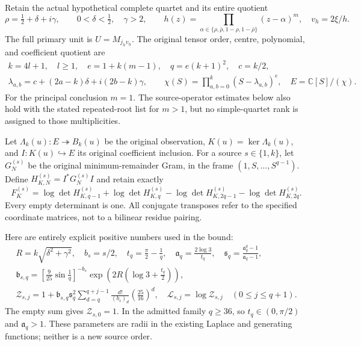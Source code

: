 \documentclass[11pt,a4paper]{article}
\begin{document}
Retain the actual hypothetical complete quartet and its entire quotient
\[
 \rho=\tfrac12+\delta+i\gamma,\qquad 0<\delta<\tfrac12,\quad \gamma>2,
 \qquad h(z)=\prod_{\alpha\in\{\rho,\bar\rho,1-\rho,1-\bar\rho\}}
 (z-\alpha)^m,\quad v_h=2\xi/h.
\]
The full primary unit is $U=M_{j_hv_h}$. The original tensor order, centre,
polynomial, and coefficient quotient are
\[
\begin{gathered}
 k=4l+1,\quad l\ge1,\quad e=1+k(m-1),\quad q=e(k+1)^2,\quad c=k/2,\\
 \lambda_{a,b}=c+(2a-k)\delta+i(2b-k)\gamma,\qquad
 \chi(S)=\prod_{a,b=0}^k(S-\lambda_{a,b})^e,
 \quad E=\mathbb C[S]/(\chi).
\end{gathered}\tag{AKS1}
\]
For the principal conclusion $m=1$. The source-operator estimates below
also hold with the stated repeated-root list for $m>1$, but no simple-quartet
rank is assigned to those multiplicities.

Let $\Lambda_k(u):E\twoheadrightarrow B_k(u)$ be the original observation,
$K(u)=\ker\Lambda_k(u)$, and $I:K(u)\hookrightarrow E$ its original
coefficient inclusion. For a source $s\in\{1,k\}$, let $G_N^{(s)}$ be the
original minimum-remainder Gram, in the frame $(1,S,\ldots,S^{q-1})$.
Define $H_{K,N}^{(s)}=I^*G_N^{(s)}I$ and retain exactly
\[
 F_K^{(s)}=
 \log\det H_{K,q-1}^{(s)}+\log\det H_{K,q}^{(s)}
 -\log\det H_{K,2q-1}^{(s)}-\log\det H_{K,2q}^{(s)}.
 \tag{AKS2}
\]
Every empty determinant is one. All conjugate transposes refer to the
specified coordinate matrices, not to a bilinear residue pairing.

Here are entirely explicit positive numbers used in the bound:
\[
\begin{gathered}
 R=k\sqrt{\delta^2+\gamma^2},\quad b_s=s/2,\quad
 t_q=\frac\pi2-\frac1q,\quad \mathfrak a_q=\frac{2\log3}{t_q},\quad
 \mathfrak s_q=\frac{\mathfrak a_q^q-1}{\mathfrak a_q-1},\\
 \mathfrak b_{s,q}=\left[\frac9{25}\sin\frac1q\right]^{-b_s}
       \exp\left(2R\left(\log3+\frac{t_q}{2}\right)\right),\\
 \mathcal Z_{s,j}=1+\mathfrak b_{s,q}\mathfrak s_q^2
        \sum_{d=q}^{q+j-1}\frac{d!}{(b_s)_d}
                          \left(\frac{25}{16}\right)^d,
 \quad \mathcal L_{s,j}=\log \mathcal Z_{s,j}\quad (0\le j\le q+1).
\end{gathered}\tag{AKS3}
\]
The empty sum gives $\mathcal Z_{s,0}=1$. In the admitted family $q\ge36$, so
$t_q\in(0,\pi/2)$ and $\mathfrak a_q>1$. These parameters are radii in the existing
Laplace and generating functions; neither is a new source order.
\end{document}
